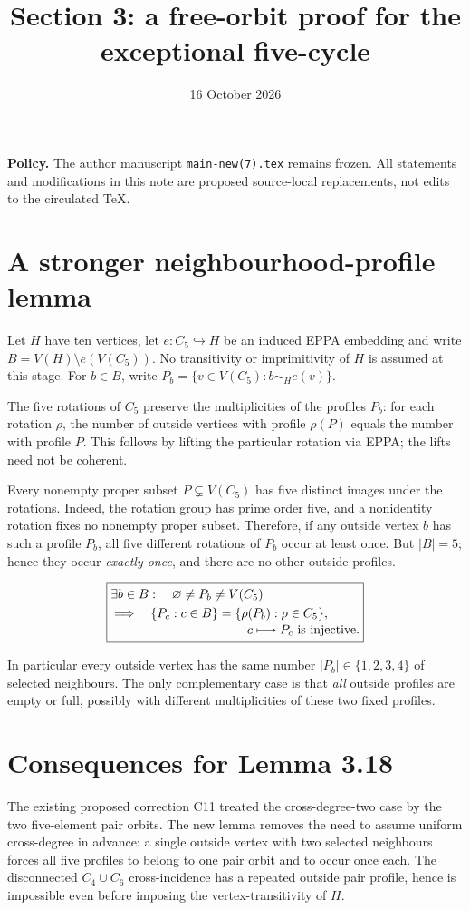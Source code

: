 \documentclass[11pt,a4paper]{article}
\title{Section 3: a free-orbit proof for the exceptional five-cycle}
\date{16 October 2026}
\begin{document}
\maketitle
\noindent\textbf{Policy.}
The author manuscript \texttt{main-new(7).tex} remains frozen.
All statements and modifications in this note are proposed
source-local replacements, not edits to the circulated TeX.

\section*{A stronger neighbourhood-profile lemma}
Let \(H\) have ten vertices, let \(e:C_5\hookrightarrow H\)
be an induced EPPA embedding and write \(B=V(H)\setminus e(V(C_5))\).
No transitivity or imprimitivity of \(H\) is assumed at this stage.
For \(b\in B\), write
\(P_b=\{v\in V(C_5): b\sim_H e(v)\}\).

The five rotations of \(C_5\) preserve the multiplicities of the
profiles \(P_b\): for each rotation \(\rho\), the number of
outside vertices with profile \(\rho(P)\) equals the number
with profile \(P\). This follows by lifting the particular
rotation via EPPA; the lifts need not be coherent.

Every nonempty proper subset \(P\subsetneq V(C_5)\)
has five distinct images under the rotations. Indeed, the
rotation group has prime order five, and a nonidentity
rotation fixes no nonempty proper subset. Therefore, if
any outside vertex \(b\) has such a profile \(P_b\), all five
different rotations of \(P_b\) occur at least once.
But \(|B|=5\); hence they occur \emph{exactly once},
and there are no other outside profiles.

\[
\boxed{
\begin{aligned}
&\exists b\in B:\quad \varnothing\ne P_b\ne V(C_5)\\
&\Longrightarrow
\quad \{P_c:c\in B\}
   =\{\rho(P_b):\rho\in C_5\},\\[-2pt]
&\hspace{38mm} c\longmapsto P_c
  \text{ is injective}.
\end{aligned}}
\]

In particular every outside vertex has the same number
\(|P_b|\in\{1,2,3,4\}\) of selected neighbours.
The only complementary case is that \emph{all}
outside profiles are empty or full, possibly with
different multiplicities of these two fixed profiles.

\section*{Consequences for Lemma 3.18}
The existing proposed correction C11 treated the
cross-degree-two case by the two five-element pair orbits.
The new lemma removes the need to assume uniform
cross-degree in advance: a single outside vertex with
two selected neighbours forces all five profiles to
belong to one pair orbit and to occur once each.
The disconnected \(C_4\dot\cup C_6\) cross-incidence
has a repeated outside pair profile, hence is impossible
even before imposing the vertex-transitivity of \(H\).
\end{document}
